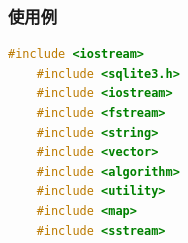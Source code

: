 \documentclass [11pt,a4paper,dvipdfmx] {jarticle}
\begin{document}
\subsubsection{使用例}
\begin{lstlisting}[language=C++]
    #include <iostream>
    #include <sqlite3.h>
    #include <iostream>                                                                                                                                                                                                                                                             
    #include <fstream>                                                                                                                                                                                                                                                              
    #include <string>                                                                                                                                                                                                                                                               
    #include <vector>                                                                                                                                                                                                                                                               
    #include <algorithm>                                                                                                                                                                                                                                                            
    #include <utility>                                                                                                                                                                                                                                                              
    #include <map>                                                                                                                                                                                                                                                                  
    #include <sstream>                                                                                                                                                                                                                                                              
                                                                                                                                                                                                                                                                                    

\end{lstlisting}
\end{document}
